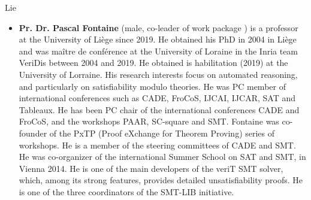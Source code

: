 \begin{sitedescription}{Lie}
\begin{itemize}
\item{\bf Pr. Dr. Pascal Fontaine} (male, co-leader of work package ) is a
  professor at the University of Liège since 2019.  He obtained his PhD in 2004
  in Liège and was maître de conférence at the University of Loraine in the
  Inria team VeriDis between 2004 and 2019.  He obtained is habilitation (2019)
  at the University of Lorraine.  His research interests focus on automated
  reasoning, and particularly on satisfiability modulo theories.  He was PC
  member of international conferences such as CADE, FroCoS, IJCAI, IJCAR, SAT
  and Tableaux.  He has been PC chair of the international conferences CADE and
  FroCoS, and the workshops PAAR, SC-square and SMT.  Fontaine was co-founder of
  the PxTP (Proof eXchange for Theorem Proving) series of workshops.  He is a
  member of the steering committees of CADE and SMT.  He was co-organizer of the
  international Summer School on SAT and SMT, in Vienna 2014.  He is one of the
  main developers of the veriT SMT solver, which, among its strong features,
  provides detailed unsatisfiability proofs.  He is one of the three
  coordinators of the SMT-LIB initiative.
\end{itemize}

\end{sitedescription}


